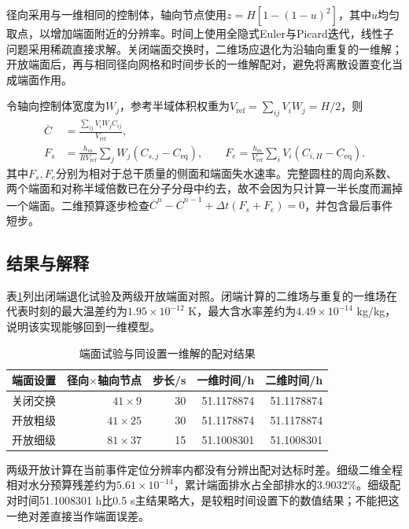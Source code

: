 径向采用与一维相同的控制体，轴向节点使用$z=H[1-(1-u)^2]$，其中$u$均匀取点，以增加端面附近的分辨率。时间上使用全隐式Euler与Picard迭代，线性子问题采用稀疏直接求解。关闭端面交换时，二维场应退化为沿轴向重复的一维解；开放端面后，再与相同径向网格和时间步长的一维解配对，避免将离散设置变化当成端面作用。

令轴向控制体宽度为$W_j$，参考半域体积权重为$V_{\mathrm{ref}}=\sum_{ij}V_iW_j=H/2$，则
\begin{equation}
 \begin{aligned}
 \overline C&=\frac{\sum_{ij}V_iW_jC_{ij}}{V_{\mathrm{ref}}},\\
 F_s&=\frac{h_m}{RV_{\mathrm{ref}}}\sum_jW_j(C_{s,j}-C_{\mathrm{eq}}),\qquad
 F_e=\frac{h_m}{V_{\mathrm{ref}}}\sum_iV_i(C_{i,H}-C_{\mathrm{eq}}).
 \end{aligned}
 \label{eq:2d-budget}
\end{equation}
其中$F_s,F_e$分别为相对于总干质量的侧面和端面失水速率。完整圆柱的周向系数、两个端面和对称半域倍数已在分子分母中约去，故不会因为只计算一半长度而漏掉一个端面。二维预算逐步检查$\overline C^n-\overline C^{n-1}+\Delta t(F_s+F_e)=0$，并包含最后事件短步。

\subsection{结果与解释}
表\ref{tab:endface-paired}列出闭端退化试验及两级开放端面对照。闭端计算的二维场与重复的一维场在代表时刻的最大温差约为$1.95\times10^{-12}$ K，最大含水率差约为$4.49\times10^{-14}$ kg/kg，说明该实现能够回到一维模型。

\begin{table}[htbp]
\centering\caption{端面试验与同设置一维解的配对结果}\label{tab:endface-paired}
\begin{tabular}{lrrrr}\toprule
端面设置 & 径向$\times$轴向节点 & 步长/s & 一维时间/h & 二维时间/h\\\midrule
关闭交换 & $41\times9$ & 30 & 51.1178874 & 51.1178874\\
开放粗级 & $41\times25$ & 30 & 51.1178874 & 51.1178874\\
开放细级 & $81\times37$ & 15 & 51.1008301 & 51.1008301\\\bottomrule
\end{tabular}
\end{table}

两级开放计算在当前事件定位分辨率内都没有分辨出配对达标时差。细级二维全程相对水分预算残差约为$5.61\times10^{-14}$，累计端面排水占全部排水的3.9032\%。细级配对时间51.1008301 h比0.5 s主结果略大，是较粗时间设置下的数值结果；不能把这一绝对差直接当作端面误差。

